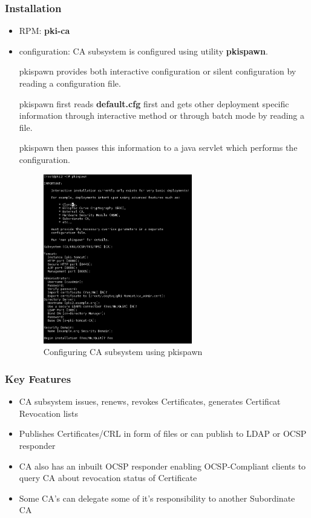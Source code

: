 \documentclass[a4paper]{article}
\begin{document}
\subsubsection{Installation}
    \begin{itemize}
        \item RPM: \textrm{\textbf{pki-ca}}
        \item configuration:  CA subsystem is configured using utility \textbf{pkispawn}. 
            
            pkispawn provides both interactive configuration  or silent configuration by reading a configuration file. 
            
            pkispawn first reads \textbf{default.cfg} first and gets other deployment specific information through interactive method
            or through batch mode by reading a file. 

            pkispawn then passes this information to a java servlet which performs the configuration. 
        \begin{figure}[ht!]
            \centering
            \includegraphics[width=65mm]{pkispawn-ca.png}
            \caption{Configuring CA subsystem using pkispawn}
        \end{figure}
    \end{itemize}
\subsubsection{Key Features}
    \begin{itemize}
        \item CA subsystem issues, renews, revokes Certificates, generates Certificat Revocation lists
        \item Publishes Certificates/CRL in form of files or can publish to LDAP or OCSP responder
        \item CA also has an inbuilt OCSP responder enabling OCSP-Compliant clients to query CA about revocation status of Certificate
        \item Some CA's can delegate some of it's responsibility to another Subordinate CA
    \end{itemize}
\end{document}
